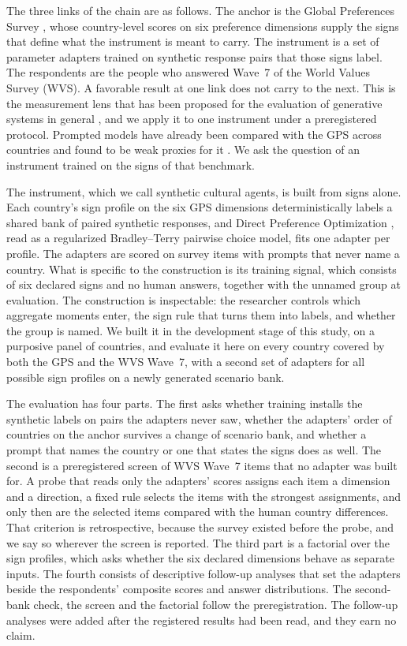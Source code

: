The three links of the chain are as follows. The anchor is the Global Preferences Survey \citep[GPS;][]{falk2018}, whose country-level scores on six preference dimensions supply the signs that define what the instrument is meant to carry. The instrument is a set of parameter adapters trained on synthetic response pairs that those signs label. The respondents are the people who answered Wave~7 of the World Values Survey (WVS). A favorable result at one link does not carry to the next. This is the measurement lens that has been proposed for the evaluation of generative systems in general \citep{wallach2025}, and we apply it to one instrument under a preregistered protocol. Prompted models have already been compared with the GPS across countries and found to be weak proxies for it \citep{chen2026}. We ask the question of an instrument trained on the signs of that benchmark.

The instrument, which we call synthetic cultural agents, is built from signs alone. Each country's sign profile on the six GPS dimensions deterministically labels a shared bank of paired synthetic responses, and Direct Preference Optimization \citep{rafailov2023}, read as a regularized Bradley--Terry pairwise choice model, fits one adapter per profile. The adapters are scored on survey items with prompts that never name a country. What is specific to the construction is its training signal, which consists of six declared signs and no human answers, together with the unnamed group at evaluation. The construction is inspectable: the researcher controls which aggregate moments enter, the sign rule that turns them into labels, and whether the group is named. We built it in the development stage of this study, on a purposive panel of  countries, and evaluate it here on every country covered by both the GPS and the WVS Wave~7, with a second set of adapters for all  possible sign profiles on a newly generated scenario bank.

The evaluation has four parts. The first asks whether training installs the synthetic labels on pairs the adapters never saw, whether the adapters' order of countries on the anchor survives a change of scenario bank, and whether a prompt that names the country or one that states the signs does as well. The second is a preregistered screen of  WVS Wave~7 items that no adapter was built for. A probe that reads only the adapters' scores assigns each item a dimension and a direction, a fixed rule selects the items with the strongest assignments, and only then are the selected items compared with the human country differences. That criterion is retrospective, because the survey existed before the probe, and we say so wherever the screen is reported. The third part is a factorial over the  sign profiles, which asks whether the six declared dimensions behave as separate inputs. The fourth consists of descriptive follow-up analyses that set the adapters beside the respondents' composite scores and answer distributions. The second-bank check, the screen and the factorial follow the preregistration. The follow-up analyses were added after the registered results had been read, and they earn no claim.

